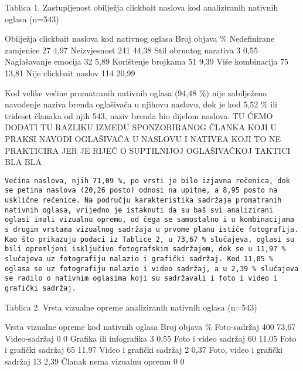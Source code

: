 \documentclass[preprint, 3p,
authoryear]{elsarticle} %
\begin{document}
Tablica 1. Zastupljenost obilježja clickbait naslova kod analiziranih
nativnih oglasa (n=543)

Obilježja clickbait naslova kod nativnog oglasa Broj objava \%
Nedefinirane zamjenice 27 4,97 Neizvjesnost 241 44,38 Stil obrnutog
narativa 3 0,55 Naglašavanje emocija 32 5,89 Korištenje brojkama 51 9,39
Više kombinacija 75 13,81 Nije clickbait naslov 114 20,99

Kod velike većine promatranih nativnih oglasa (94,48 \%) nije
zabilježeno navođenje naziva brenda oglašivača u njihovu naslovu, dok je
kod 5,52 \% ili trideset članaka od njih 543, naziv brenda bio dijelom
naslova. TU ĆEMO DODATI TU RAZLIKU IZMEĐU SPONZORIRANOG ČLANKA KOJI U
PRAKSI NAVODI OGLAŠIVAČA U NASLOVU I NATIVEA KOJI TO NE PRAKTICIRA JER
JE RIJEČ O SUPTILNIJOJ OGLAŠIVAČKOJ TAKTICI BLA BLA

\begin{verbatim}
Većina naslova, njih 71,09 %, po vrsti je bilo izjavna rečenica, dok se petina naslova (20,26 posto) odnosi na upitne, a 8,95 posto na usklične rečenice. Na području karakteristika sadržaja promatranih nativnih oglasa, vrijedno je istaknuti da su baš svi analizirani oglasi imali vizualnu opremu, od čega se samostalno i u kombinacijama s drugim vrstama vizualnog sadržaja u prvome planu ističe fotografija. Kao što prikazuju podaci iz Tablice 2, u 73,67 % slučajeva, oglasi su bili opremljeni isključivo fotografskim sadržajem, dok se u 11,97 % slučajeva uz fotografiju nalazio i grafički sadržaj. Kod 11,05 % oglasa se uz fotografiju nalazio i video sadržaj, a u 2,39 % slučajeva se radilo o nativnim oglasima koji su sadržavali i foto i video i grafički sadržaj. 
\end{verbatim}

Tablica 2. Vrsta vizualne opreme analiziranih nativnih oglasa (n=543)

Vrsta vizualne opreme kod nativnih oglasa Broj objava \% Foto-sadržaj
400 73,67 Video-sadržaj 0 0 Grafika ili infografika 3 0,55 Foto i video
sadržaj 60 11,05 Foto i grafički sadržaj 65 11,97 Video i grafički
sadržaj 2 0,37 Foto, video i grafički sadržaj 13 2,39 Članak nema
vizualnu opremu 0 0
\end{document}
